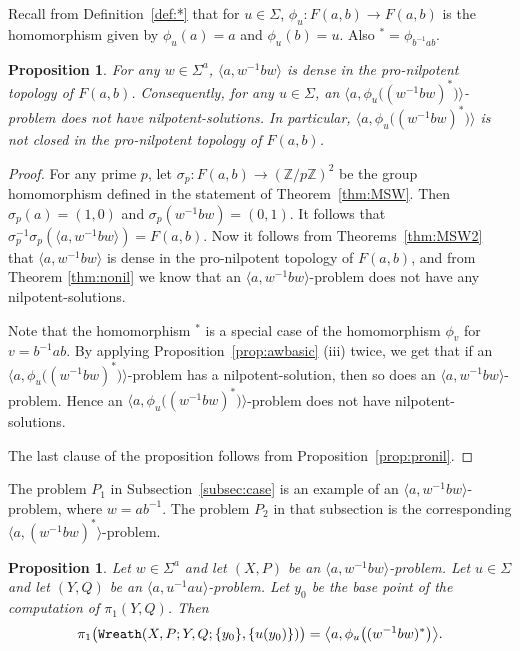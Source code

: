 \documentclass[10pt,a4paper]{amsart}
\newtheorem{proposition}[theorem]{Proposition}
\theoremstyle{definition}
\theoremstyle{definition}
\numberwithin{equation}{section}
\begin{document}
Recall from Definition~\ref{def:*} that for $u\in \Sigma$, $\phi_u\colon F(a, b)\to F(a, b)$ is the homomorphism given by $\phi_u(a)=a$ and $\phi_u(b)=u$. Also ${}^*=\phi_{b^{-1}ab}$.


\begin{proposition}\label{prop:stationary} For any $w\in \Sigma^a$, $\langle a, w^{-1}bw\rangle$ is dense in the pro-nilpotent topology of $F(a, b)$. Consequently, for any $u\in \Sigma$, an $\big\langle a, \phi_u\big((w^{-1}bw)^*\big)\big\rangle$-problem does not have nilpotent-solutions. In particular, $\big\langle a, \phi_u\big((w^{-1}bw)^*\big)\big\rangle$ is not closed in the pro-nilpotent topology of $F(a, b)$. 
\end{proposition}

\begin{proof} For any prime $p$, let $\sigma_p\colon F(a, b)\to (\mathbb{Z}/p\mathbb{Z})^2$ be the group homomorphism defined in the statement of Theorem~\ref{thm:MSW}. Then $\sigma_p(a)=(1,0)$ and $\sigma_p(w^{-1}bw)=(0,1)$. It follows that $\sigma_p^{-1}\sigma_p(\langle a, w^{-1}bw\rangle)=F(a, b)$. Now it follows from Theorems~\ref{thm:MSW2} that $\langle a, w^{-1}bw\rangle$ is dense in the pro-nilpotent topology of $F(a, b)$, and from Theorem \ref{thm:nonil} we know that an $\langle a, w^{-1}bw\rangle$-problem does not have any nilpotent-solutions.

Note that the homomorphism ${}^*$ is a special case of the homomorphism $\phi_v$ for $v=b^{-1}ab$. By applying Proposition~\ref{prop:awbasic} (iii) twice, we get that if an $\big\langle a, \phi_u\big((w^{-1}bw)^*\big)\big\rangle$-problem has a nilpotent-solution, then so does an $\langle a, w^{-1}bw\rangle$-problem. Hence an $\big\langle a, \phi_u\big((w^{-1}bw)^*\big)\big\rangle$-problem does not have nilpotent-solutions. 

The last clause of the proposition follows from Proposition~\ref{prop:pronil}.
\end{proof}


The problem $P_1$ in Subsection~\ref{subsec:case} is an example of an $\langle a, w^{-1}bw\rangle$-problem, where $w=ab^{-1}$. The problem $P_2$ in that subsection is the corresponding $\langle a, (w^{-1}bw)^*\rangle$-problem.


\begin{proposition}\label{prop:wrsolution} Let $w\in \Sigma^a$ and let $(X, P)$ be an $\langle a, w^{-1}bw\rangle$-problem. Let $u\in \Sigma$ and let $(Y, Q)$ be an $\langle a, u^{-1}au\rangle$-problem. Let $y_0$ be the base point of the computation of $\pi_1(Y, Q)$. Then 
$$\pi_1\big(\mbox{\tt Wreath}(X,P; Y, Q; \{y_0\}, \{u(y_0)\})\big)=
\big\langle a, \phi_u\big((w^{-1}bw)^*\big)\big\rangle. $$
\end{proposition}
\end{document}
